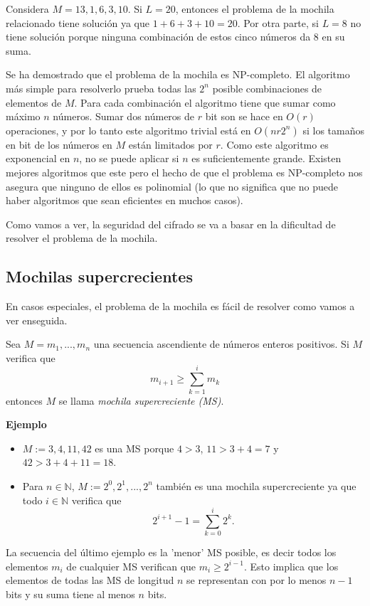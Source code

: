 \documentclass[12pt]{article}
\newcommand{\N}{\mathbb{N}}
\newenvironment{definition}[2][Definición]{\begin{trivlist}
\item[\hskip \labelsep {\bfseries #1}]}{\end{trivlist}}
\newenvironment{example}[1][Ejemplo]{\begin{trivlist}
\item[\hskip \labelsep {\bfseries #1}]}{\end{trivlist}}
\begin{document}
\begin{example}
Considera $M = 13, 1, 6, 3, 10$. Si $L = 20$, entonces el problema de la mochila relacionado tiene solución ya que $1+6+3+10 = 20$. Por otra parte, si $L = 8$ no tiene solución porque ninguna combinación de estos cinco números da $8$ en su suma.
\end{example}
Se ha demostrado que el problema de la mochila es NP-completo. El algoritmo más simple para resolverlo prueba todas las $2^n$ posible combinaciones de elementos de $M$. Para cada combinación el algoritmo tiene que sumar como máximo $n$ números. Sumar dos números de $r$ bit son se hace en $O(r)$ operaciones, y por lo tanto este algoritmo trivial está en $O(nr2^n)$ si los tamaños en bit de los números en $M$ están limitados por $r$. Como este algoritmo es exponencial en $n$, no se puede aplicar si $n$ es suficientemente grande. Existen mejores algoritmos que este pero el hecho de que el problema es NP-completo nos asegura que ninguno de ellos es polinomial (lo que no significa que no puede haber algoritmos que sean eficientes en muchos casos).

Como vamos a ver, la seguridad del cifrado se va a basar en la dificultad de resolver el problema de la mochila.

\subsection*{Mochilas supercrecientes}

En casos especiales, el problema de la mochila es fácil de resolver como vamos a ver enseguida.

\begin{definition}{1}
Sea $M = m_1, ..., m_n$ una secuencia ascendiente de números enteros positivos. Si $M$ verifica que
$$m_{i+1} \geq \sum_{k=1}^im_k$$
entonces $M$ se llama \emph{mochila supercreciente (MS)}.
\end{definition}
\textbf{Ejemplo}
\begin{itemize}
\item
$M := 3, 4, 11, 42$ es una MS porque $4 > 3$, $11 > 3 + 4 = 7$ y $42 > 3 + 4 + 11 = 18$.

\item 
Para $n \in \N$, $M := 2^0, 2^1, ..., 2^n$ también es una mochila supercreciente ya que todo $i \in \N$ verifica que
$$2^{i+1} - 1 = \sum_{k=0}^i2^k.$$
\end{itemize}
La secuencia del último ejemplo es la 'menor' MS posible, es decir todos los elementos $m_i$ de cualquier MS verifican que $m_i \geq 2^{i-1}$. Esto implica que los elementos de todas las MS de longitud $n$ se representan con por lo menos $n-1$ bits y su suma tiene al menos $n$ bits.
\end{document}
